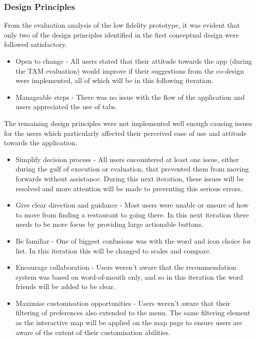 \documentclass[a4 paper, 12pt]{article}
\begin{document}
    \subsubsection*{Design Principles}
    From the evaluation analysis of the low fidelity prototype, it was evident that only two of the design principles identified in the first conceptual design were followed satisfactory.   
    \begin{itemize}
        \item Open to change - All users stated that their attitude towards the app (during the TAM evaluation) would improve if their suggestions from the co-design were implemented, all of which will be in this following iteration.  
        \item Manageable steps - There was no issue with the flow of the application and users appreciated the use of tabs.
    \end{itemize}
    
    The remaining design principles were not implemented well enough causing issues for the users which particularly affected their perceived ease of use and attitude towards the application.
        \begin{itemize}
            \item Simplify decision process - All users encountered at least one issue, either during the gulf of execution or evaluation, that prevented them from moving forwards without assistance. During this next iteration, these issues will be resolved and more attention will be made to preventing this serious errors.
            \item Give clear direction and guidance - Most users were unable or unsure of how to move from finding a restaurant to going there. In this next iteration there needs to be more focus by providing large actionable buttons.
            \item Be familiar - One of biggest confusions was with the word and icon choice for list. In this iteration this will be changed to scales and compare. 
            \item Encourage collaboration - Users weren't aware that the recommendation system was based on word-of-mouth only, and so in this iteration the word friends will be added to be clear.
            \item Maximise customisation opportunities - Users weren't aware that their filtering of preferences also extended to the menu. The same filtering element as the interactive map will be applied on the map page to ensure users are aware of the extent of their customisation abilities.
        \end{itemize}
\end{document}
